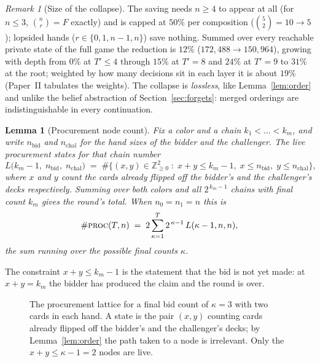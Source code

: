 \documentclass[11pt]{article}
\theoremstyle{plain}
\newtheorem{lemma}[theorem]{Lemma}
\theoremstyle{definition}
\theoremstyle{remark}
\newtheorem{remark}[theorem]{Remark}
\begin{document}
\begin{remark}[Size of the collapse]\label{rem:ordersave}
The saving needs $n\ge 4$ to appear at all (for $n\le 3$,
$\binom{n}{r}=F$ exactly) and is capped at $50\%$ per composition
($\binom{5}{2}=10\to 5$); lopsided hands ($r\in\{0,1,n-1,n\}$) save
nothing. Summed over every reachable private state of the full game the
reduction is $12\%$ ($172{,}488\to 150{,}964$), growing with depth from
$0\%$ at $T'\le 4$ through $15\%$ at $T'=8$ and $24\%$ at $T'=9$ to
$31\%$ at the root; weighted by how many decisions sit in each layer it
is about $19\%$ (Paper~II tabulates the weights). The collapse is
\emph{lossless}, like Lemma~\ref{lem:order} and unlike the belief
abstraction of Section~\ref{sec:forgets}: merged orderings are
indistinguishable in every continuation.
\end{remark}

\begin{lemma}[Procurement node count]\label{lem:proccount}
Fix a color and a chain $k_1<\dots<k_m$, and write $n_{\mathrm{bid}}$ and
$n_{\mathrm{chal}}$ for the hand sizes of the bidder and the challenger.
The live procurement states for that chain number
\[
  L\bigl(k_m-1,\;n_{\mathrm{bid}},\;n_{\mathrm{chal}}\bigr)\;=\;
  \#\bigl\{(x,y)\in\mathbb{Z}_{\ge0}^2 \;:\; x+y\le k_m-1,\;
        x\le n_{\mathrm{bid}},\; y\le n_{\mathrm{chal}}\bigr\},
\]
where $x$ and $y$ count the cards already flipped off the bidder's and the
challenger's decks respectively. Summing over both colors and all
$2^{\,k_m-1}$ chains with final count $k_m$ gives the round's total. When
$n_0=n_1=n$ this is
\[
  \#\textup{\textsc{proc}}(T,n)\;=\;2\sum_{\kappa=1}^{T}2^{\,\kappa-1}\,L(\kappa-1,n,n),
\]
the sum running over the possible final counts $\kappa$.
\end{lemma}

The constraint $x+y\le k_m-1$ is the statement that the bid is not yet
made: at $x+y=k_m$ the bidder has produced the claim and the round is over.

\begin{figure}[t]
\centering
{}
\caption{The procurement lattice for a final bid count of $\kappa=3$ with
two cards in each hand. A state is the pair $(x,y)$ counting cards already
flipped off the bidder's and the challenger's decks; by
Lemma~\ref{lem:order} the path taken to a node is irrelevant. Only the
$x+y\le \kappa-1=2$ nodes are live.}
\label{fig:proclattice}
\end{figure}
\end{document}
